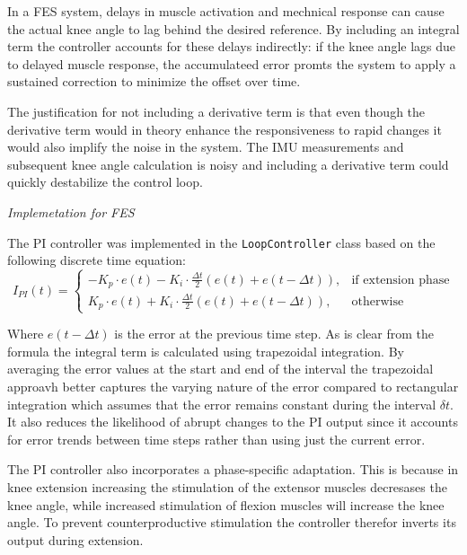 
In a FES system, delays in muscle activation and mechnical response can cause the actual knee angle to lag behind the desired reference. By including an integral term the controller accounts for these delays indirectly: if the knee angle lags due to delayed muscle response, the accumulateed error promts the system to apply a sustained correction to minimize the offset over time.

The justification for not including a derivative term is that even though the derivative term would in theory enhance the responsiveness to rapid changes it would also implify the noise in the system. The IMU measurements and subsequent knee angle calculation is noisy and including a derivative term could quickly destabilize the control loop.
\newline 

\textit{Implemetation for FES}

The PI controller was implemented in the \texttt{LoopController} class based on the following discrete time equation:
\begin{equation}
I_{PI}(t) = 
\begin{cases} 
-K_p \cdot e(t) - K_i \cdot \frac{\Delta t}{2} \left(e(t) + e(t-\Delta t)\right), & \text{if extension phase} \\
K_p \cdot e(t) + K_i \cdot \frac{\Delta t}{2} \left(e(t) + e(t-\Delta t)\right), & \text{otherwise}
\end{cases}
\end{equation}

Where \( e(t-\Delta t) \) is the error at the previous time step. As is clear from the formula the integral term is calculated using trapezoidal integration. By averaging the error values at the start and end of the interval the trapezoidal approavh better captures the varying nature of the error compared to rectangular integration which assumes that the error remains constant during the interval \(\delta t\). It also reduces the likelihood of abrupt changes to the PI output since it accounts for error trends between time steps rather than using just the current error.

The PI controller also incorporates a phase-specific adaptation. This is because in knee extension increasing the stimulation of the extensor muscles decresases the knee angle, while increased stimulation of flexion muscles will increase the knee angle. To prevent counterproductive stimulation the controller therefor inverts its output during extension.



